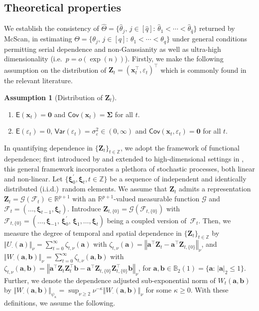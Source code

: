 \documentclass[11pt, a4paper]{article}
\newcommand{\mbf}{\mathbf}
\newcommand{\mc}{\mathcal}
\newcommand{\vep}{\varepsilon}
\renewcommand{\l}{\left}
\renewcommand{\r}{\right}
\def\wh{\widehat}
\newcommand{\cp}{\theta}
\newcommand{\Cp}{\Theta}
\newcommand{\E}[0]{\mathsf{E}}
\newcommand{\Var}[0]{\mathsf{Var}}
\newcommand{\Cov}[0]{\mathsf{Cov}}
\newcommand{\R}{\mathbb{R}}
\newcommand{\Z}{\mathbb{Z}}
\theoremstyle{definition}
\theoremstyle{definition}
\theoremstyle{definition}
\theoremstyle{definition}
\theoremstyle{definition}
\newtheorem{assum}{Assumption}
\theoremstyle{remark}
\theoremstyle{definition}
\theoremstyle{definition}
\theoremstyle{definition}
\begin{document}
\subsection{Theoretical properties}
\label{ss:th:pt}

We establish the consistency of $\wh{\Cp} = \bigl\{\wh\cp_j, \, j \in [\wh q]: \, \wh\cp_1 < \cdots < \wh\cp_{\wh q} \bigr\}$ returned by McScan, in estimating $\Cp = \bigl\{\cp_j, \, j \in [q]: \, \cp_1 < \cdots < \cp_q \bigr\}$ under general conditions permitting serial dependence and non-Gaussianity as well as ultra-high dimensionality (i.e.\ $p = o(\exp(n))$).
Firstly, we make the following assumption on the distribution of $\mbf Z_t = (\mbf x_t^\top, \vep_t)^\top$ which is commonly found in the relevant literature.
\begin{assum}[Distribution of $\mbf Z_t$]
	\label{assum:xe}
	\begin{enumerate}[wide, label = (\roman*)]
		\item  
		$\E(\mbf x_t) = \mbf 0$ and $\Cov(\mbf x_t) = \bm\Sigma$ for all $t$.
		\item 
		$\E(\vep_t) = 0$, $\Var(\vep_t) = \sigma_\vep^2 \in (0, \infty)$ and $\Cov(\mbf x_t, \vep_t) = \mbf 0$ for all $t$.
	\end{enumerate}
\end{assum}

In quantifying dependence in $\{\mbf Z_t\}_{t \in \Z}$, we adopt the framework of functional dependence; first introduced by \cite{Wu05} and extended to high-dimensional settings in \cite{zhang2017gaussian}, this general framework incorporates a plethora of stochastic processes, both linear and non-linear.
Let $\{\bm\xi_0^\prime, \bm\xi_t, t\in \Z\}$ be a sequence of independent and identically distributed (i.i.d.)~random elements. 
We assume that $\mbf Z_t$ admits a representation $\mbf Z_t = \mc G(\mc F_t) \in \R^{p + 1}$ with an $\R^{p+1}$-valued measurable function $\mc G$ and $\mc F_t = (\ldots, \bm\xi_{t-1}, \bm\xi_{t})$. Introduce $\mbf Z_{t, \{0\}} = \mc G(\mc F_{t, \{0\}})$ with $\mc F_{t, \{0\}} = (\ldots, \bm\xi_{-1}, \, \bm\xi_0^\prime,\, \bm\xi_{1}, \ldots, \bm\xi_{t})$ being a coupled version of~$\mc F_t$.  Then, we measure the degree of temporal and spatial dependence in $\{\mbf Z_t\}_{t \in \Z}$ by
$\Vert U_{\cdot}(\mbf a) \Vert_{\nu} = \sum_{t = 0}^\infty \zeta_{t, \nu}(\mbf a)$ with $\zeta_{t, \nu}(\mbf a) = \l\Vert \mbf a^\top \mbf Z_t - \mbf a^\top \mbf Z_{t, \{0\}} \r\Vert_\nu$,  and $\Vert{ W_{\cdot}(\mbf a, \mbf b) }\Vert_{\nu} = \sum_{t = 0}^\infty \zeta_{t, \nu}(\mbf a, \mbf b)$  with $\zeta_{t, \nu}(\mbf a, \mbf b) = \l\Vert \mbf a^\top \mbf Z_t \mbf Z_t^\top \mbf b - \mbf a^\top \mbf Z_{t, \{0\}} \mbf Z_{t, \{0\}}^\top \mbf b \r\Vert_\nu$, for $\mbf a, \mbf b \in \mathbb{B}_2(1) = \{\mbf a: \, \vert \mbf a \vert_2 \le 1\}$.
Further, we denote the dependence adjusted sub-exponential norm
of $W_t(\mbf a, \mbf b)$ by
$\Vert W_{\cdot}(\mbf a, \mbf b) \Vert_{\psi_\kappa}
= \sup_{\nu \ge 2} \nu^{-\kappa} \Vert{ W_{\cdot}(\mbf a, \mbf b) }\Vert_{\nu}$ for some $\kappa \ge 0$. With these definitions, we assume the following. 
\end{document}
